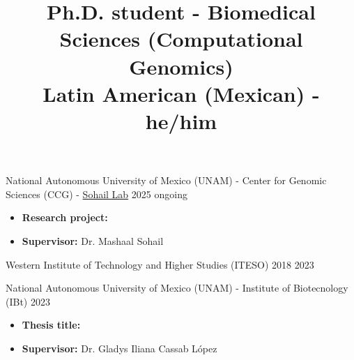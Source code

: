 \documentclass{simplecv}
\title{Ph.D. student - Biomedical Sciences (Computational Genomics) \\ \footnotesize{Latin American (Mexican) - he/him}}
\begin{document}
\setmainfont{Heuristica} %
\setsansfont{Cabin} %
\makecvheader{}
\thispagestyle{firstpage}

%
%


    {National Autonomous University of Mexico (UNAM) - Center for Genomic Sciences (CCG) - \href{https://www.sohaillab.com/}{Sohail Lab}} %
    {} %
    {2025} %
    {ongoing} %
    {
        \vspace{-11pt}
        \begin{itemize}[leftmargin=*]
        \setlength{\itemsep}{0cm}
          \item \textbf{Research project:} 
          \item \textbf{Supervisor:} Dr. Mashaal Sohail
        \end{itemize}
    } %

    {Western Institute of Technology and Higher Studies (ITESO)} %
    {} %
    {2018} %
    {2023} %
    {} %


    {National Autonomous University of Mexico (UNAM) - Institute of Biotecnology (IBt)} %
    {} %
    {} %
    {2023} %
    {
        \vspace{-11pt}
        \begin{itemize}[leftmargin=*]
        \setlength{\itemsep}{0cm}
            \item \textbf{Thesis title:} 
            \item \textbf{Supervisor:} Dr. Gladys Iliana Cassab López
        \end{itemize}
    } %
\end{document}
